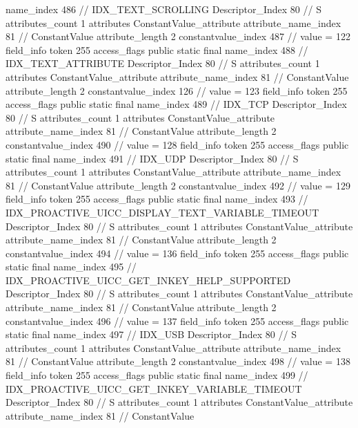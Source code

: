 {{{{{				name_index	486		// IDX_TEXT_SCROLLING
				Descriptor_Index	80		// S
				attributes_count	1
				attributes {
				ConstantValue_attribute {
					attribute_name_index	81		// ConstantValue
					attribute_length	2
					constantvalue_index	487		// value = 122
				}
				}
			}
			field_info {
				token	255
				access_flags	public static final
				name_index	488		// IDX_TEXT_ATTRIBUTE
				Descriptor_Index	80		// S
				attributes_count	1
				attributes {
				ConstantValue_attribute {
					attribute_name_index	81		// ConstantValue
					attribute_length	2
					constantvalue_index	126		// value = 123
				}
				}
			}
			field_info {
				token	255
				access_flags	public static final
				name_index	489		// IDX_TCP
				Descriptor_Index	80		// S
				attributes_count	1
				attributes {
				ConstantValue_attribute {
					attribute_name_index	81		// ConstantValue
					attribute_length	2
					constantvalue_index	490		// value = 128
				}
				}
			}
			field_info {
				token	255
				access_flags	public static final
				name_index	491		// IDX_UDP
				Descriptor_Index	80		// S
				attributes_count	1
				attributes {
				ConstantValue_attribute {
					attribute_name_index	81		// ConstantValue
					attribute_length	2
					constantvalue_index	492		// value = 129
				}
				}
			}
			field_info {
				token	255
				access_flags	public static final
				name_index	493		// IDX_PROACTIVE_UICC_DISPLAY_TEXT_VARIABLE_TIMEOUT
				Descriptor_Index	80		// S
				attributes_count	1
				attributes {
				ConstantValue_attribute {
					attribute_name_index	81		// ConstantValue
					attribute_length	2
					constantvalue_index	494		// value = 136
				}
				}
			}
			field_info {
				token	255
				access_flags	public static final
				name_index	495		// IDX_PROACTIVE_UICC_GET_INKEY_HELP_SUPPORTED
				Descriptor_Index	80		// S
				attributes_count	1
				attributes {
				ConstantValue_attribute {
					attribute_name_index	81		// ConstantValue
					attribute_length	2
					constantvalue_index	496		// value = 137
				}
				}
			}
			field_info {
				token	255
				access_flags	public static final
				name_index	497		// IDX_USB
				Descriptor_Index	80		// S
				attributes_count	1
				attributes {
				ConstantValue_attribute {
					attribute_name_index	81		// ConstantValue
					attribute_length	2
					constantvalue_index	498		// value = 138
				}
				}
			}
			field_info {
				token	255
				access_flags	public static final
				name_index	499		// IDX_PROACTIVE_UICC_GET_INKEY_VARIABLE_TIMEOUT
				Descriptor_Index	80		// S
				attributes_count	1
				attributes {
				ConstantValue_attribute {
					attribute_name_index	81		// ConstantValue
}}}}}}}
